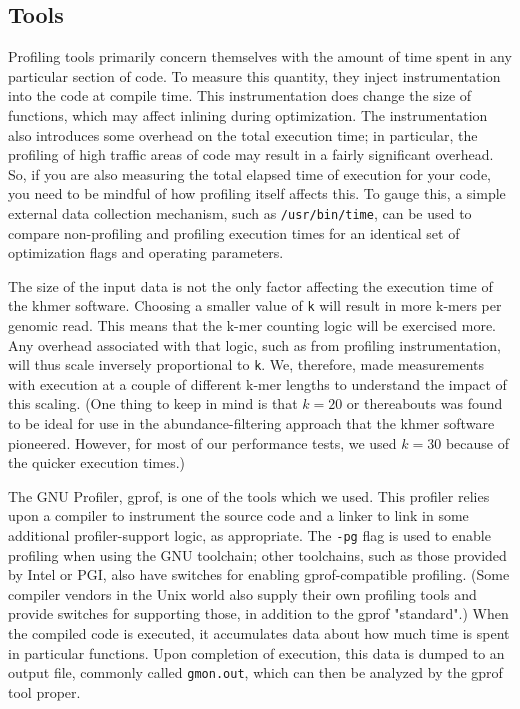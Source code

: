 \documentclass{article}
\begin{document}
\subsection{Tools}

Profiling tools primarily concern themselves with the amount of time spent in any particular section of code. To measure this quantity, they inject instrumentation into the code at compile time. This instrumentation does change the size of functions, which may affect inlining during optimization. The instrumentation also introduces some overhead on the total execution time; in particular, the profiling of high traffic areas of code may result in a fairly significant overhead. So, if you are also measuring the total elapsed time of execution for your code, you need to be mindful of how profiling itself affects this. To gauge this, a simple external data collection mechanism, such as \texttt{/usr/bin/time}, can be used to compare non-profiling and profiling execution times for an identical set of optimization flags and operating parameters.


The size of the input data is not the only factor affecting the execution time of the khmer software. Choosing a smaller value of \texttt{k} will result in more k-mers per genomic read. This means that the k-mer counting logic will be exercised more. Any overhead associated with that logic, such as from profiling instrumentation, will thus scale inversely proportional to \texttt{k}. We, therefore, made measurements with execution at a couple of different k-mer lengths to understand the impact of this scaling. (One thing to keep in mind is that $k = 20$ or thereabouts was found to be ideal for use in the abundance-filtering approach that the khmer software pioneered. However, for most of our performance tests, we used $k = 30$ because of the quicker execution times.)

The GNU Profiler, gprof, is one of the tools which we used. This profiler relies upon a compiler to instrument the source code and a linker to link in some additional profiler-support logic, as appropriate. The \texttt{-pg} flag is used to enable profiling when using the GNU toolchain; other toolchains, such as those provided by Intel or PGI, also have switches for enabling gprof-compatible profiling. (Some compiler vendors in the Unix world also supply their own profiling tools and provide switches for supporting those, in addition to the gprof "standard".) When the compiled code is executed, it accumulates data about how much time is spent in particular functions. Upon completion of execution, this data is dumped to an output file, commonly called \texttt{gmon.out}, which can then be analyzed by the gprof tool proper.
\end{document}
